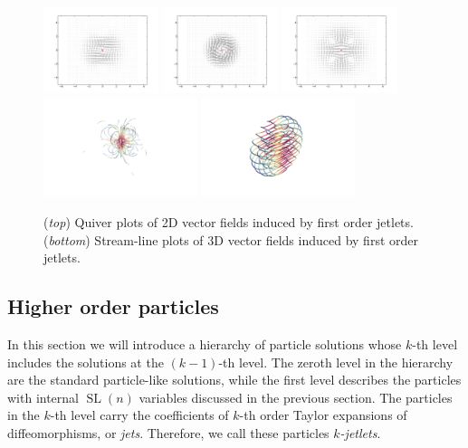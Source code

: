 \documentclass[12pt]{amsart}
\DeclareMathOperator{\SL}{SL}
\begin{document}
  \begin{figure}
  	\centering
        \includegraphics[width=0.3\textwidth]{shear.pdf}
        \includegraphics[width=0.3\textwidth]{spin.pdf}
        \includegraphics[width=0.3\textwidth]{stretch.pdf}
        \\
        \includegraphics[width=0.4\textwidth]{stretch_3D.png}
        \includegraphics[width=0.4\textwidth]{shear_3D.png}
        \caption{(\emph{top}) Quiver plots of 2D vector fields induced by first order jetlets. 
        (\emph{bottom})   Stream-line plots of 3D vector fields induced by first order jetlets.}
        \label{fig:zoo}
  \end{figure}

  \subsection{Higher order particles}
  \label{sec:higher_order}
  In this section we will introduce a hierarchy of particle solutions whose $k$-th level includes the solutions at the $(k-1)$-th level.
  The zeroth level in the hierarchy are the standard particle-like solutions,
  while the first level describes the particles with internal $\SL(n)$ variables
  discussed in the previous section.
  The particles in the $k$-th level carry the coefficients of
  $k$-th order Taylor expansions of diffeomorphisms,
  or \emph{jets}.
  Therefore, we call these particles \emph{$k$-jetlets}.
\end{document}

